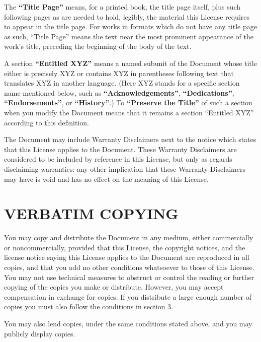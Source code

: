The \textbf{``Title Page''} means, for a printed book, the title page itself,
plus such following pages as are needed to hold, legibly,
the material this License requires to appear in the title page. For
works in formats which do not have any title page as such, ``Title Page'' means the text near
the most prominent appearance of the work’s title, preceding the beginning of the body of the
text.

A section \textbf{``Entitled XYZ''} means a named subunit of the Document whose title either is
precisely XYZ or contains XYZ in parentheses following text that translates XYZ in another
language. (Here XYZ stands for a specific section name mentioned below, such as
\textbf{``Acknowledgements''}, \textbf{``Dedications''}, \textbf{``Endorsements''},
or \textbf{``History''}.) To \textbf{``Preserve the Title''} of such a section
when you modify the Document means that it remains a section ``Entitled XYZ'' according to
this definition.

The Document may include Warranty Disclaimers next to the notice which states that this
License applies to the Document. These Warranty Disclaimers are considered to be included by
reference in this License, but only as regards disclaiming warranties: any other implication that
these Warranty Disclaimers may have is void and has no effect on the meaning of this License.


\section{VERBATIM COPYING}
You may copy and distribute the Document in any medium, either commercially or noncommercially,
provided that this License, the copyright notices, and the license notice saying this
License applies to the Document are reproduced in all copies, and that you add no other
conditions whatsoever to those of this License. You may not use technical measures to obstruct or
control the reading or further copying of the copies you make or distribute. However, you may
accept compensation in exchange for copies. If you distribute a large enough number of copies
you must also follow the conditions in section 3.

You may also lend copies, under the same conditions stated above, and you may publicly
display copies.


